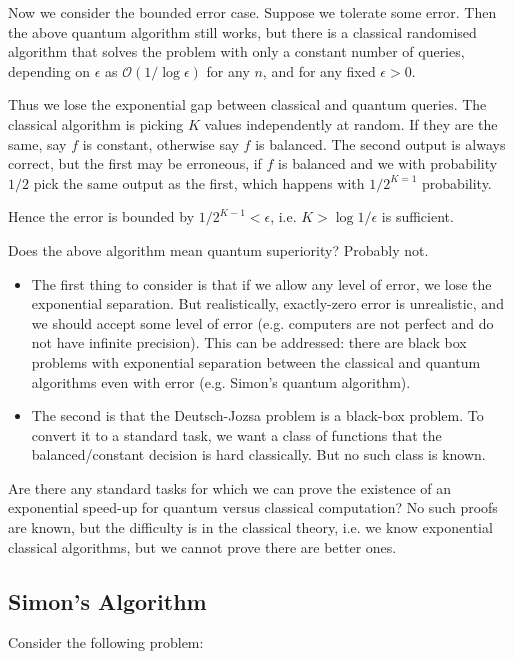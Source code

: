\documentclass[12pt]{article}
\begin{document}
Now we consider the bounded error case. Suppose we tolerate some error. Then the above quantum algorithm still works, but there is a classical randomised algorithm that solves the problem with only a constant number of queries, depending on $\epsilon$ as $\mathcal{O}(1/ \log \epsilon)$ for any $n$, and for any fixed $\epsilon > 0$.

Thus we lose the exponential gap between classical and quantum queries. The classical algorithm is picking $K$ values independently at random. If they are the same, say $f$ is constant, otherwise say $f$ is balanced. The second output is always correct, but the first may be erroneous, if $f$ is balanced and we with probability $1/2$ pick the same output as the first, which happens with $1/2^{K=1}$ probability.

Hence the error is bounded by $1/2^{K-1} < \epsilon$, i.e. $K > \log 1/\epsilon$ is sufficient.

Does the above algorithm mean quantum superiority? Probably not.
\begin{itemize}
	\item The first thing to consider is that if we allow any level of error, we lose the exponential separation. But realistically, exactly-zero error is unrealistic, and we should accept some level of error (e.g. computers are not perfect and do not have infinite precision). This can be addressed: there are black box problems with exponential separation between the classical and quantum algorithms even with error (e.g. Simon's quantum algorithm).
	\item The second is that the Deutsch-Jozsa problem is a black-box problem. To convert it to a standard task, we want a class of functions that the balanced/constant decision is hard classically. But no such class is known.
\end{itemize}

Are there any standard tasks for which we can prove the existence of an exponential speed-up for quantum versus classical computation? No such proofs are known, but the difficulty is in the classical theory, i.e. we know exponential classical algorithms, but we cannot prove there are better ones.

\subsection{Simon's Algorithm}
\label{sub:simonas}

Consider the following problem:
\end{document}
